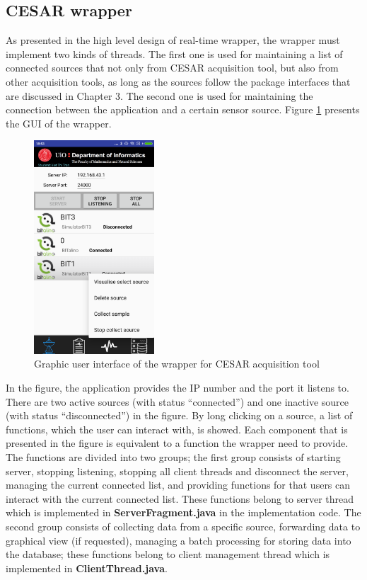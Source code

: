 \subsection{CESAR wrapper}
As presented in the high level design of real-time wrapper, the wrapper must implement two kinds of threads. The first one is used for maintaining a list of connected sources that not only from CESAR acquisition tool, but also from other acquisition tools, as long as the sources follow the package interfaces that are discussed in Chapter 3. The second one is used for maintaining the connection between the application and a certain sensor source. Figure \ref{fig:Figures/CESARGUIWrapper} presents the GUI of the wrapper. 
\begin{figure}
    \centering
    \includegraphics[width=0.4\textwidth]{Figures/CESARGUIWrapper.png}
    \caption{Graphic user interface of the wrapper for CESAR acquisition tool}
    \label{fig:Figures/CESARGUIWrapper}
\end{figure}
In the figure, the application provides the IP number and the port it listens to. There are two active sources (with status “connected”) and one inactive source (with status “disconnected”) in the figure. By long clicking on a source, a list of functions, which the user can interact with, is showed. Each component that is presented in the figure is equivalent to a function the wrapper need to provide. The functions are divided into two groups; the first group consists of starting server, stopping listening, stopping all client threads and disconnect the server, managing the current connected list, and providing functions for that users can interact with the current connected list. These functions belong to server thread which is implemented in \textbf{ServerFragment.java} in the implementation code. The second group consists of collecting data from a specific source, forwarding data to graphical view (if requested), managing a batch processing for storing data into the database; these functions belong to client management thread which is implemented in \textbf{ClientThread.java}.\\
